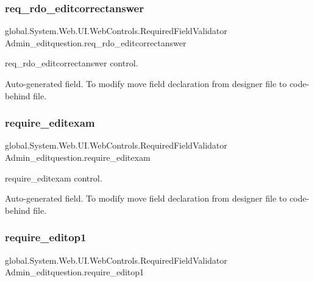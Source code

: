 \subsubsection{\texorpdfstring{req\_rdo\_editcorrectanswer}{req\_rdo\_editcorrectanswer}}
{\footnotesize\ttfamily global.\+System.\+Web.\+U\+I.\+Web\+Controls.\+Required\+Field\+Validator Admin\+\_\+editquestion.\+req\+\_\+rdo\+\_\+editcorrectanswer\hspace{0.3cm}{\ttfamily [protected]}}



req\+\_\+rdo\+\_\+editcorrectanswer control. 

Auto-\/generated field. To modify move field declaration from designer file to code-\/behind file. \mbox{\label{class_admin__editquestion_a5d1f80c1e0153993f4ba971555805e60}} 
\subsubsection{\texorpdfstring{require\_editexam}{require\_editexam}}
{\footnotesize\ttfamily global.\+System.\+Web.\+U\+I.\+Web\+Controls.\+Required\+Field\+Validator Admin\+\_\+editquestion.\+require\+\_\+editexam\hspace{0.3cm}{\ttfamily [protected]}}



require\+\_\+editexam control. 

Auto-\/generated field. To modify move field declaration from designer file to code-\/behind file. \mbox{\label{class_admin__editquestion_aff043281ccaa424ebadfa8573dc9a17f}} 
\subsubsection{\texorpdfstring{require\_editop1}{require\_editop1}}
{\footnotesize\ttfamily global.\+System.\+Web.\+U\+I.\+Web\+Controls.\+Required\+Field\+Validator Admin\+\_\+editquestion.\+require\+\_\+editop1\hspace{0.3cm}{\ttfamily [protected]}}




